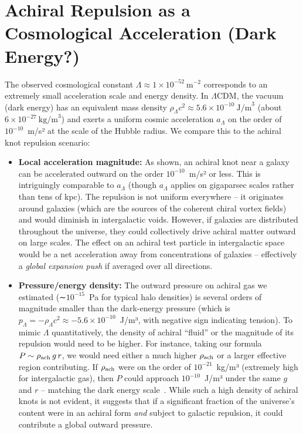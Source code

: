 
\section*{Achiral Repulsion as a Cosmological Acceleration (Dark Energy?)}

The observed cosmological constant $\Lambda \approx 1\times10^{-52}~\text{m}^{-2}$ corresponds to an extremely small acceleration scale and energy density. In $\Lambda$CDM, the vacuum (dark energy) has an equivalent mass density $\rho_\Lambda c^2 \approx 5.6\times10^{-10}~\text{J/m}^3$ (about $6\times10^{-27}~\text{kg/m}^3$) and exerts a uniform cosmic acceleration $a_\Lambda$ on the order of $10^{-10}$~m/s² at the scale of the Hubble radius. We compare this to the achiral knot repulsion scenario:

\begin{itemize}
\item
\textbf{Local acceleration magnitude:} As shown, an achiral knot near a galaxy can be accelerated outward on the order $10^{-10}$~m/s² or less. This is intriguingly comparable to $a_\Lambda$ (though $a_\Lambda$ applies on gigaparsec scales rather than tens of kpc). The repulsion is not uniform everywhere – it originates around galaxies (which are the sources of the coherent chiral vortex fields) and would diminish in intergalactic voids. However, if galaxies are distributed throughout the universe, they could collectively drive achiral matter outward on large scales. The effect on an achiral test particle in intergalactic space would be a net acceleration away from concentrations of galaxies – effectively a \textit{global expansion push} if averaged over all directions.

\item
\textbf{Pressure/energy density:} The outward pressure on achiral gas we estimated (∼$10^{-15}$~Pa for typical halo densities) is several orders of magnitude smaller than the dark-energy pressure (which is $p_\Lambda = -\rho_\Lambda c^2 \approx -5.6\times10^{-10}$~J/m³, with negative sign indicating tension). To mimic $\Lambda$ quantitatively, the density of achiral “fluid” or the magnitude of its repulsion would need to be higher. For instance, taking our formula $P \sim \rho_{\rm ach} \, g \, r$, we would need either a much higher $\rho_{\rm ach}$ or a larger effective region contributing. If $\rho_{\rm ach}$ were on the order of $10^{-21}$~kg/m³ (extremely high for intergalactic gas), then $P$ could approach $10^{-10}$~J/m³ under the same $g$ and $r$ – matching the dark energy scale~\cite{knot_theroy_in_fluid}. While such a high density of achiral knots is not evident, it suggests that if a significant fraction of the universe’s content were in an achiral form \textit{and} subject to galactic repulsion, it could contribute a global outward pressure.


\end{itemize}
